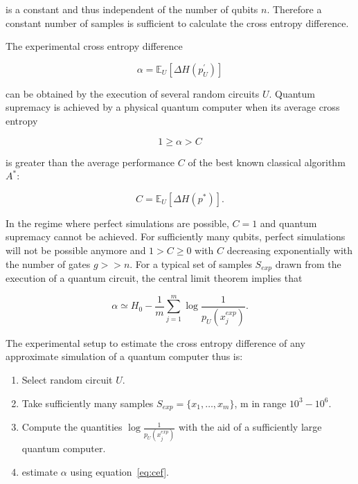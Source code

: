 is a constant and thus independent of the number of qubits $n$. Therefore a
constant number of samples is sufficient to calculate the cross entropy
difference.

The experimental cross entropy difference

\begin{equation}
  \alpha = \mathbb{E}_U[\Delta H(p^{\prime}_U)]
\end{equation}

can be obtained by the execution of several random circuits $U$. Quantum
supremacy is achieved by a physical quantum computer when its average cross
entropy

\begin{equation}
  1 \geq \alpha > C
\end{equation}

is greater than the average performance $C$ of the best known classical algorithm $A^*$:

\begin{equation}
  C = \mathbb{E}_U[\Delta H(p^*)] .
\end{equation}

In the regime where perfect simulations are possible, $C=1$ and quantum
supremacy cannot be achieved. For sufficiently many qubits, perfect simulations
will not be possible anymore and $1 > C \geq 0$ with $C$ decreasing exponentially
with the number of gates $g>>n$. For a typical set of samples $S_{exp}$ drawn from the
execution of a quantum circuit, the central limit theorem implies that

\begin{equation}
  \label{eq:cef}
  \alpha \simeq H_0 - \frac{1}{m} \sum_{j = 1}^m \log{\frac{1}{p_U(x_j^{exp})}}.
\end{equation}

The experimental setup to estimate the cross entropy difference of any
approximate simulation of a quantum computer thus is:

\begin{enumerate}
\item Select random circuit $U$.
  \item Take sufficiently many samples $S_{exp} = \{x_1, \dots, x_m\}$, m in
    range $10^3-10^6$.
    \item Compute the quantities $\log{\frac{1}{p_U(x_j^{exp})}}$ with the aid
      of a sufficiently large quantum computer.
      \item estimate $\alpha$ using equation~\ref{eq:cef}.
\end{enumerate}

